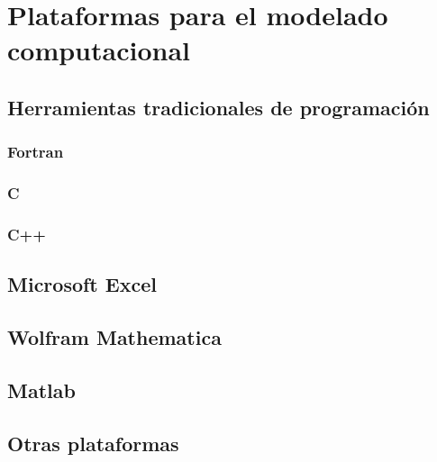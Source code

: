 \chapter{Plataformas para el modelado computacional}

\section{Herramientas tradicionales de programación}

\subsection{Fortran}

\subsection{C}

\subsection{C++}

\section{Microsoft Excel}

\section{Wolfram Mathematica}

\section{Matlab}

\section{Otras plataformas}
